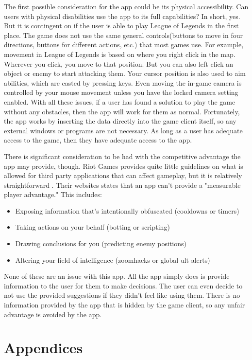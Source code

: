 \documentclass[10pt,twocolumn]{article}
\begin{document}
The first possible consideration for the app could be its physical accessibility.
Can users with physical disabilities use the app to its full capabilities?
In short, yes.
But it is contingent on if the user is able to play League of Legends in the first place.
The game does not use the same general controls(buttons to move in four directions, buttons for different actions, etc.) that most games use.
For example, movement in League of Legends is based on where you right click in the map.
Wherever you click, you move to that position.
But you can also left click an object or enemy to start attacking them.
Your cursor position is also used to aim abilities, which are casted by pressing keys.
Even moving the in-game camera is controlled by your mouse movement unless you have the locked camera setting enabled.
With all these issues, if a user has found a solution to play the game without any obstacles, then the app will work for them as normal.
Fortunately, the app works by inserting the data directly into the game client itself, so any external windows or programs are not necessary.
As long as a user has adequate access to the game, then they have adequate access to the app.

There is significant consideration to be had with the competitive advantage the app may provide, though.
Riot Games provides quite little guidelines on what is allowed for third party applications that can affect gameplay, but it is relatively straightforward \cite{RiotGamesThirdPartyApplication}.
Their websites states that an app can't provide a "measurable player advantage."
This includes:
\begin{itemize}
    \item Exposing information that’s intentionally obfuscated (cooldowns or timers)
    \item Taking actions on your behalf (botting or scripting)
    \item Drawing conclusions for you (predicting enemy positions)
    \item Altering your field of intelligence (zoomhacks or global ult alerts)
\end{itemize}
None of these are an issue with this app.
All the app simply does is provide information to the user for them to make decisions.
The user can even decide to not use the provided suggestions if they didn't feel like using them.
There is no information provided by the app that is hidden by the game client, so any unfair advantage is avoided by the app.

\section{Appendices}
\end{document}
